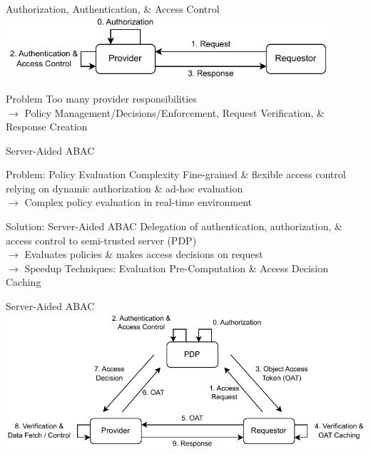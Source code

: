 \documentclass[en]{sdqbeamer}
\begin{document}
\begin{frame}{Authorization, Authentication, \& Access Control}
    \centering
	\includegraphics[width=0.9\textwidth]{./figures/access_control_request_traditional.drawio.pdf}
    \begin{redblock}{Problem}
        Too many provider responsibilities
        \\$\rightarrow$ Policy Management/Decisions/Enforcement, Request Verification, \& Response Creation
    \end{redblock}
\end{frame}

\begin{frame}{Server-Aided ABAC}
    \begin{redblock}{Problem: Policy Evaluation Complexity}
        Fine-grained \& flexible access control relying on dynamic authorization \& ad-hoc evaluation
        \\$\rightarrow$ Complex policy evaluation in real-time environment
    \end{redblock}

    \begin{greenblock}{Solution: Server-Aided ABAC}
        Delegation of authentication, authorization, \& access control to semi-trusted server (PDP)
        \\$\rightarrow$ Evaluates policies \& makes access decisions on request
        \\$\rightarrow$ Speedup Techniques: Evaluation Pre-Computation \& Access Decision Caching
    \end{greenblock}
\end{frame}

\begin{frame}{Server-Aided ABAC}
    \centering
    \includegraphics[width=1.0\textwidth]{./figures/access_control_request_delegation.drawio.pdf}
\end{frame}
\end{document}
